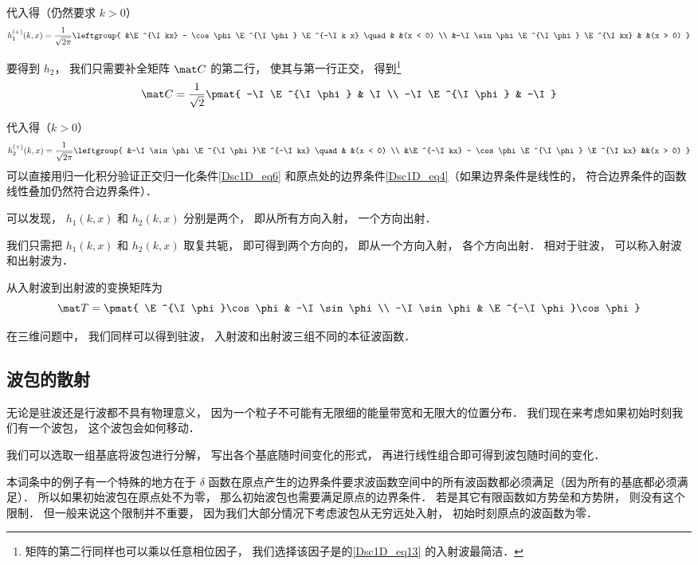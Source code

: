 代入得（仍然要求 $k > 0$）
\begin{equation}\label{Dsc1D_eq11}
h_1^{(+)}(k, x) =  \frac{1}{\sqrt{2\pi}}\leftgroup{
&\E^{\I kx} - \cos\phi \E^{\I\phi} \E^{-\I k x} \quad & &(x < 0) \\
&-\I\sin\phi\E^{\I\phi} \E^{\I kx}  & &(x > 0)
}\end{equation}

要得到 $h_2$， 我们只需要补全矩阵 $\mat C$ 的第二行， 使其与第一行正交， 得到\footnote{矩阵的第二行同样也可以乘以任意相位因子， 我们选择该因子是的\autoref{Dsc1D_eq13} 的入射波最简洁．}
\begin{equation}
\mat C = \frac{1}{\sqrt{2}}\pmat{
-\I\E^{\I \phi} & \I \\
-\I\E^{\I \phi} & -\I
}\end{equation}

代入得（$k > 0$）
\begin{equation}\label{Dsc1D_eq13}
h_2^{(+)}(k, x) =  \frac{1}{\sqrt{2\pi}} \leftgroup{
&-\I\sin\phi\E^{\I\phi}\E^{-\I kx} \quad & &(x < 0) \\
&\E^{-\I kx} - \cos\phi \E^{\I \phi} \E^{\I kx} &&(x > 0)
}\end{equation}
可以直接用归一化积分验证正交归一化条件\autoref{Dsc1D_eq6} 和原点处的边界条件\autoref{Dsc1D_eq4}（如果边界条件是线性的， 符合边界条件的函数线性叠加仍然符合边界条件）．

可以发现， $h_1(k, x)$ 和 $h_2(k, x)$ 分别是两个， 即从所有方向入射， 一个方向出射．

我们只需把 $h_1(k, x)$ 和 $h_2(k, x)$ 取复共轭， 即可得到两个方向的， 即从一个方向入射， 各个方向出射． 相对于驻波， 可以称入射波和出射波为．

从入射波到出射波的变换矩阵为
\begin{equation}
\mat T = \pmat{
\E^{\I\phi}\cos\phi & -\I \sin\phi \\
-\I \sin\phi & \E^{-\I\phi}\cos\phi
}\end{equation}

在三维问题中， 我们同样可以得到驻波， 入射波和出射波三组不同的本征波函数．

\subsection{波包的散射}
无论是驻波还是行波都不具有物理意义， 因为一个粒子不可能有无限细的能量带宽和无限大的位置分布． 我们现在来考虑如果初始时刻我们有一个波包， 这个波包会如何移动．

我们可以选取一组基底将波包进行分解， 写出各个基底随时间变化的形式， 再进行线性组合即可得到波包随时间的变化．

本词条中的例子有一个特殊的地方在于 $\delta$ 函数在原点产生的边界条件要求波函数空间中的所有波函数都必须满足（因为所有的基底都必须满足）． 所以如果初始波包在原点处不为零， 那么初始波包也需要满足原点的边界条件． 若是其它有限函数如方势垒和方势阱， 则没有这个限制． 但一般来说这个限制并不重要， 因为我们大部分情况下考虑波包从无穷远处入射， 初始时刻原点的波函数为零．



